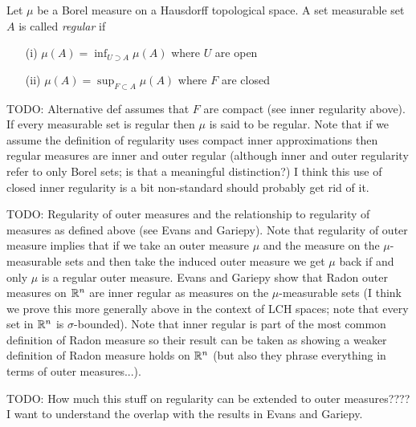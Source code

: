 \begin{defn}Let $\mu$ be a Borel measure on a Hausdorff topological space. A set measurable set $A$ is called \emph{regular} if 
\begin{itemize}
\item[(i)]$\mu(A) = \inf_{U \supset A} \mu(A)$ where $U$ are open
\item[(ii)]$\mu(A) = \sup_{F \subset A} \mu(A)$ where $F$ are closed 
\end{itemize}
TODO: Alternative def assumes that $F$ are compact (see inner
regularity above).  If every measurable set is regular then $\mu$ is
said to be regular.  Note that if we assume the definition of
regularity uses compact inner approximations then regular measures are
inner and outer regular (although inner and outer regularity refer to
only Borel sets; is that a meaningful distinction?)  I think this use
of closed inner regularity is a bit non-standard should probably get
rid of it.
\end{defn}


TODO: Regularity of outer measures and the relationship to regularity
of measures as defined above (see Evans and Gariepy).  Note that
regularity of outer measure implies that if we take an outer measure $\mu$
and the measure on the $\mu$-measurable sets and then take the induced
outer measure we get $\mu$ back if and only $\mu$ is a regular outer
measure.  Evans and Gariepy show that Radon outer measures on
$\mathbb{R}^n$ are inner
regular as measures on the $\mu$-measurable sets (I think we prove this more
generally above in the context of LCH spaces; note that every set in
$\mathbb{R}^n$ is $\sigma$-bounded).  Note that inner
regular is part of the most common definition of Radon measure so
their result can be taken as showing a weaker definition of Radon
measure holds on $\mathbb{R}^n$ (but also they phrase everything in terms
of outer measures...).

TODO: How much this stuff on regularity can be extended to outer
measures????  I want to understand the overlap with the results in
Evans and Gariepy.

